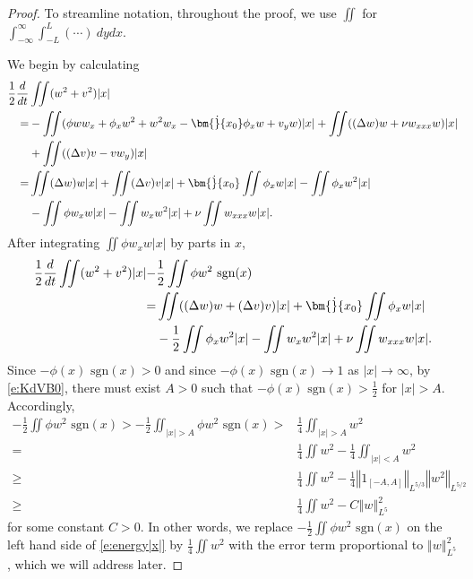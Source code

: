 \documentclass[final,11pt]{article}
\renewcommand{\geq}{\geqslant}
\theoremstyle{definition} %
\newcommand{\lv}{\left\Vert}
\newcommand{\rv}{\right\Vert}
\newcommand{\half}{\frac{1}{2}}
\newcommand{\sgn}{\textrm{ sgn}}
\theoremstyle{plain}
\theoremstyle{definition} %
\theoremstyle{remark}
\begin{document}
\begin{proof}
To streamline notation, throughout the proof, we use $\iint$ for $\int_{-\infty}^\infty\int_{-L}^L(\cdots)~dydx$. 

We begin by calculating
\begin{align*}
\frac{1}{2}\frac{d}{dt}& \iint (w^2 + v^2)|x|  \\
=&  -\iint ( \phi w w_{x} +  \phi_{x}w ^ { 2 } + w^{2}w_{x} - \bm{\dot}{x_0}\phi_{x}w + v_{y}w)|x| +  \iint (( \Delta w ) w + \nu w _ {xxx} w)|x| \\ 
& + \iint ((\Delta v)v - vw_y)|x|   \\
= &\iint (\Delta w) w|x| + \iint (\Delta v) v|x|+ \bm{\dot}{x_0}\iint \phi_xw|x| - \iint \phi_xw^2|x| \\
&- \iint \phi w_x w|x| - \iint w_x w^2|x| + \nu \iint w_{xxx}w|x|.
\end{align*}
After integrating $\displaystyle \iint \phi w_xw|x|$ by parts in $x$, 
\begin{equation}\label{e:energy|x|}
\begin{split}
        \frac{1}{2} \frac{d}{dt} \iint (w^2 + v^2)|x| -& \half \iint \phi w^2 \sgn(x)\\
        =& \iint ((\Delta w) w+ (\Delta v) v)|x|+ \bm{\dot}{x_0}\iint \phi_xw|x|  \\
& - \half\iint \phi_xw^2|x| - \iint w_x w^2|x| + \nu \iint w_{xxx}w|x|.
    \end{split}
\end{equation}
Since $-\phi(x)\sgn(x) > 0$ \cite{BS1985} and since $-\phi(x)\sgn(x) \to 1$ as $|x| \to \infty$, by \eqref{e:KdVB0}, there must exist $A > 0$ such that $-\phi(x)\sgn(x) > \frac{1}{2}$ for $|x| > A$. Accordingly,
\begin{align*}
- \frac{1}{2} \iint \phi w^2 \sgn(x) > -\frac{1}{2}\iint_{|x|>A} \phi w^2 \sgn(x) >& \frac{1}{4}\iint_{|x|>A} w^2 \\
=&\frac{1}{4}\iint w^2 - \frac{1}{4}\iint_{|x| < A}w^2 \\  \geq & \frac{1}{4}\iint w^2 - \frac{1}{4}\lv 1_{[-A,A]}\rv_{L^{5/3}}\lv w^2 \rv_{L^{5/2}} \\
\geq & \frac{1}{4}\iint w^2  - C \lv w \rv_{L^5}^2
\end{align*}
for some constant $C>0$. In other words, we replace $\displaystyle - \frac{1}{2} \iint \phi w^2 \sgn(x)$ on the left hand side of \eqref{e:energy|x|} by $\displaystyle \frac{1}{4}\iint w^2 $ with the error term proportional to $ \lv w \rv_{L^5}^2$, which we will address later. 


\end{proof}
\end{document}
